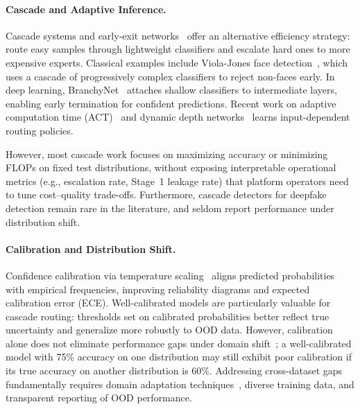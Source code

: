 \paragraph{Cascade and Adaptive Inference.}
Cascade systems and early\hyp exit networks~\cite{teerapittayanon2017branchynet,huang2018msdnet,han2024earlyexit_survey} offer an alternative efficiency strategy: route easy samples through lightweight classifiers and escalate hard ones to more expensive experts. Classical examples include Viola\hyp Jones face detection~\cite{viola2001rapid}, which uses a cascade of progressively complex classifiers to reject non\hyp faces early. In deep learning, BranchyNet~\cite{teerapittayanon2017branchynet} attaches shallow classifiers to intermediate layers, enabling early termination for confident predictions. Recent work on adaptive computation time (ACT)~\cite{graves2016act} and dynamic depth networks~\cite{wang2018skipnet} learns input\hyp dependent routing policies.

However, most cascade work focuses on maximizing accuracy or minimizing FLOPs on fixed test distributions, without exposing interpretable operational metrics (e.g., escalation rate, Stage~1 leakage rate) that platform operators need to tune cost--quality trade\hyp offs. Furthermore, cascade detectors for deepfake detection remain rare in the literature, and seldom report performance under distribution shift.

\paragraph{Calibration and Distribution Shift.}
Confidence calibration via temperature scaling~\cite{guo2017calibration,minderer2021revisiting} aligns predicted probabilities with empirical frequencies, improving reliability diagrams and expected calibration error (ECE). Well\hyp calibrated models are particularly valuable for cascade routing: thresholds set on calibrated probabilities better reflect true uncertainty and generalize more robustly to OOD data. However, calibration alone does not eliminate performance gaps under domain shift~\cite{pei2024deepfakesurvey}; a well\hyp calibrated model with 75\% accuracy on one distribution may still exhibit poor calibration if its true accuracy on another distribution is 60\%. Addressing cross\hyp dataset gaps fundamentally requires domain adaptation techniques~\cite{ganin2016dann,li2021dabn,liu2025unsupervised_da}, diverse training data, and transparent reporting of OOD performance.

